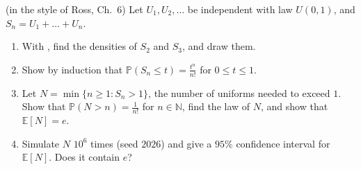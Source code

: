 \begin{exercise}\label{ex:rv-uniform-sums}
\medium (in the style of Ross, Ch.~6) Let $U_1,U_2,\dots$ be independent with law $U(0,1)$, and
$S_n=U_1+\dots+U_n$.
\begin{enumerate}[label=(\alph*)]
  \item With , find the densities of $S_2$ and $S_3$, and draw them.
  \item Show by induction that $\mathbb P(S_n\le t)=\frac{t^n}{n!}$ for $0\le t\le1$.
  \item Let $N=\min\{n\ge1:S_n>1\}$, the number of uniforms needed to exceed $1$. Show that
    $\mathbb P(N>n)=\frac1{n!}$ for $n\in\mathbb N$, find the law of $N$, and show that $\mathbb E[N]=e$.
  \item Simulate $N$ $10^6$ times (seed $2026$) and give a $95\%$ confidence interval for
    $\mathbb E[N]$. Does it contain $e$?
\end{enumerate}
\end{exercise}
